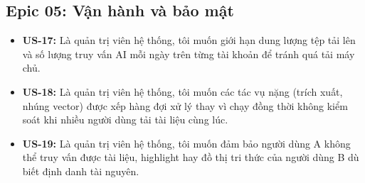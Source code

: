 \subsection{Epic 05: Vận hành và bảo mật}
\begin{itemize}
    \item \textbf{US-17:} Là quản trị viên hệ thống, tôi muốn giới hạn dung lượng tệp tải lên và số lượng truy vấn AI mỗi ngày trên từng tài khoản để tránh quá tải máy chủ.
    \item \textbf{US-18:} Là quản trị viên hệ thống, tôi muốn các tác vụ nặng (trích xuất, nhúng vector) được xếp hàng đợi xử lý thay vì chạy đồng thời không kiểm soát khi nhiều người dùng tải tài liệu cùng lúc.
    \item \textbf{US-19:} Là quản trị viên hệ thống, tôi muốn đảm bảo người dùng A không thể truy vấn được tài liệu, highlight hay đồ thị tri thức của người dùng B dù biết định danh tài nguyên.
\end{itemize}
